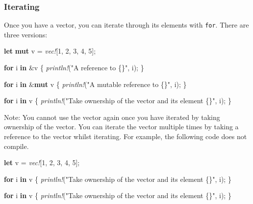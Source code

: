 \documentclass[a4paper,]{book}
\newenvironment{Shaded}{\begin{snugshade}}{\end{snugshade}}
\newcommand{\KeywordTok}[1]{\textcolor[rgb]{0.13,0.29,0.53}{\textbf{{#1}}}}
\newcommand{\DecValTok}[1]{\textcolor[rgb]{0.00,0.00,0.81}{{#1}}}
\newcommand{\StringTok}[1]{\textcolor[rgb]{0.31,0.60,0.02}{{#1}}}
\newcommand{\PreprocessorTok}[1]{\textcolor[rgb]{0.56,0.35,0.01}{\textit{{#1}}}}
\newcommand{\NormalTok}[1]{{#1}}
\begin{document}
\subsubsection{Iterating}\label{iterating}

Once you have a vector, you can iterate through its elements with
\texttt{for}. There are three versions:

\begin{Shaded}
\begin{Highlighting}[]
\KeywordTok{let} \KeywordTok{mut} \NormalTok{v = }\PreprocessorTok{vec!}\NormalTok{[}\DecValTok{1}\NormalTok{, }\DecValTok{2}\NormalTok{, }\DecValTok{3}\NormalTok{, }\DecValTok{4}\NormalTok{, }\DecValTok{5}\NormalTok{];}

\KeywordTok{for} \NormalTok{i }\KeywordTok{in} \NormalTok{&v \{}
    \PreprocessorTok{println!}\NormalTok{(}\StringTok{"A reference to \{\}"}\NormalTok{, i);}
\NormalTok{\}}

\KeywordTok{for} \NormalTok{i }\KeywordTok{in} \NormalTok{&}\KeywordTok{mut} \NormalTok{v \{}
    \PreprocessorTok{println!}\NormalTok{(}\StringTok{"A mutable reference to \{\}"}\NormalTok{, i);}
\NormalTok{\}}

\KeywordTok{for} \NormalTok{i }\KeywordTok{in} \NormalTok{v \{}
    \PreprocessorTok{println!}\NormalTok{(}\StringTok{"Take ownership of the vector and its element \{\}"}\NormalTok{, i);}
\NormalTok{\}}
\end{Highlighting}
\end{Shaded}

Note: You cannot use the vector again once you have iterated by taking
ownership of the vector. You can iterate the vector multiple times by
taking a reference to the vector whilst iterating. For example, the
following code does not compile.

\begin{Shaded}
\begin{Highlighting}[]
\KeywordTok{let} \NormalTok{v = }\PreprocessorTok{vec!}\NormalTok{[}\DecValTok{1}\NormalTok{, }\DecValTok{2}\NormalTok{, }\DecValTok{3}\NormalTok{, }\DecValTok{4}\NormalTok{, }\DecValTok{5}\NormalTok{];}

\KeywordTok{for} \NormalTok{i }\KeywordTok{in} \NormalTok{v \{}
    \PreprocessorTok{println!}\NormalTok{(}\StringTok{"Take ownership of the vector and its element \{\}"}\NormalTok{, i);}
\NormalTok{\}}

\KeywordTok{for} \NormalTok{i }\KeywordTok{in} \NormalTok{v \{}
    \PreprocessorTok{println!}\NormalTok{(}\StringTok{"Take ownership of the vector and its element \{\}"}\NormalTok{, i);}
\NormalTok{\}}
\end{Highlighting}
\end{Shaded}
\end{document}
